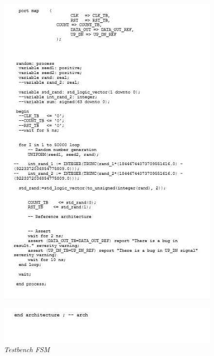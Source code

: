 \begin{figure}[!htb]
	\centering
	\includegraphics[scale=1.2]{immagini/counter_tb2}
	\label{counter_tb2}
\end{figure}
\begin{figure}[!htb]
	\centering
	\includegraphics[scale=1.2]{immagini/counter_tb3}
	\caption{\textit{Testbench FSM}}
	\label{counter_tb3}
\end{figure}
\newpage
